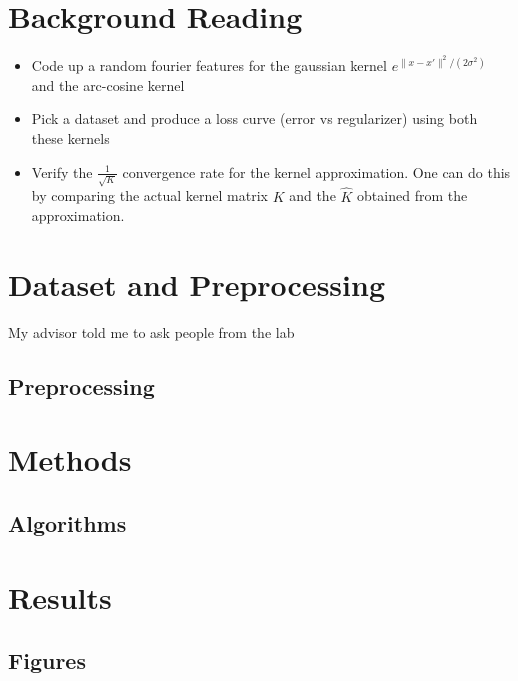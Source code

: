 \documentclass[11pt,letterpaper]{article}
\numberwithin{equation}{section} %
\numberwithin{figure}{section} %
\numberwithin{table}{section} %
\begin{document}
\section{Background Reading}

\begin{itemize}
	\item Code up a random fourier features for the gaussian kernel $e^{\|x - x'\|^2/(2 \sigma^2)}$ and the arc-cosine kernel
	\item Pick a dataset and produce a loss curve (error vs regularizer) using both these kernels
	\item Verify the $\frac{1}{\sqrt{K}}$ convergence rate for the kernel approximation. One can do this by comparing the actual kernel matrix $K$ and the $\hat{K}$ obtained from the approximation.
\end{itemize}
 

\section{Dataset and Preprocessing} %
\label{sec:dataset_and_preprocessing}

\begin{tip}My advisor told me to ask people from the lab\end{tip}

\subsection{Preprocessing} %
\label{sub:preprocessing}

\section{Methods} %
\label{sec:methods}

\subsection{Algorithms} %
\label{sub:algorithms}

\section{Results} %
\label{sec:results}

\subsection{Figures} %
\label{sub:figures}
\end{document}
